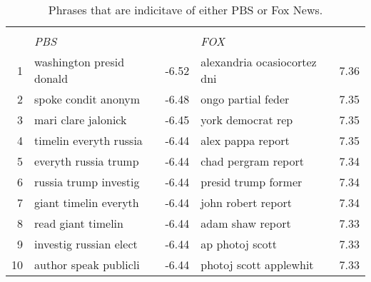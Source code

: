 \begin{table}[H]
\caption{Phrases that are indicitave of either PBS or Fox News.}
\label{tab:pbs_fox}
\centering
\begin{tabular}{rlr|lr}
  \hline
  &             &        &             &        \\
 & \textit{PBS} &  & \textit{FOX} & \\ 
  \hline
1 & washington presid donald & -6.52 & alexandria ocasiocortez dni & 7.36 \\ 
  2 & spoke condit anonym & -6.48 & ongo partial feder & 7.35 \\ 
  3 & mari clare jalonick & -6.45 & york democrat rep & 7.35 \\ 
  4 & timelin everyth russia & -6.44 & alex pappa report & 7.35 \\ 
  5 & everyth russia trump & -6.44 & chad pergram report & 7.34 \\ 
  6 & russia trump investig & -6.44 & presid trump former & 7.34 \\ 
  7 & giant timelin everyth & -6.44 & john robert report & 7.34 \\ 
  8 & read giant timelin & -6.44 & adam shaw report & 7.33 \\ 
  9 & investig russian elect & -6.44 & ap photoj scott & 7.33 \\ 
  10 & author speak publicli & -6.44 & photoj scott applewhit & 7.33 \\ 
   \hline
\end{tabular}
\end{table}
